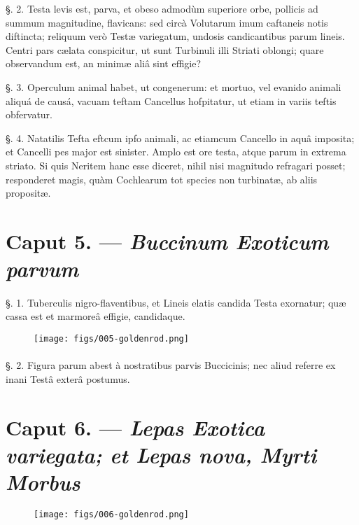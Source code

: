 \documentclass[a4paper, 11pt, oneside, polutonikogreek, german]{article}
\begin{document}
§. 2. Testa levis est, parva, et obeso admodùm superiore orbe, pollicis ad summum magnitudine, flavicans: sed circà Volutarum imum caftaneis notis diftincta; reliquum verò Testæ variegatum, undosis candicantibus parum lineis. Centri pars cælata conspicitur, ut sunt Turbinuli illi Striati oblongi; quare observandum est, an minimæ aliâ sint effigie?

§. 3. Operculum animal habet, ut congenerum: et mortuo, vel evanido animali aliquá de causá, vacuam teftam Cancellus hofpitatur, ut etiam in variis teftis obfervatur.

§. 4. Natatilis Tefta eftcum ipfo animali, ac etiamcum Cancello in aquâ imposita; et Cancelli pes major est sinister. Amplo est ore testa, atque parum in extrema striato. Si quis Neritem hanc esse diceret, nihil nisi magnitudo refragari posset; responderet magis, quàm Cochlearum tot species non turbinatæ, ab aliis propositæ.

\section{Caput 5. --- \emph{Buccinum Exoticum parvum}}
\paragraph{}
§. 1. Tuberculis nigro-flaventibus, et Lineis elatis candida Testa exornatur; quæ cassa est et marmoreâ effigie, candidaque.

\begin{figure}[H]
\centering
\texttt{[image: figs/005-goldenrod.png]}

\end{figure}
\paragraph{}
§. 2. Figura parum abest à nostratibus parvis Buccicinis; nec aliud referre ex inani Testâ exterâ postumus.

\section{Caput 6. --- \emph{Lepas Exotica variegata; et Lepas nova, Myrti Morbus}}
\begin{figure}[H]
\centering
\texttt{[image: figs/006-goldenrod.png]}

\end{figure}
\end{document}
